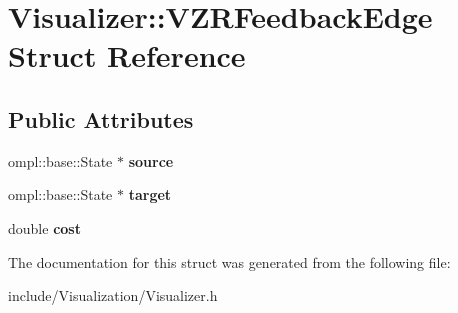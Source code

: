\hypertarget{struct_visualizer_1_1_v_z_r_feedback_edge}{\section{Visualizer\-:\-:V\-Z\-R\-Feedback\-Edge Struct Reference}
\label{struct_visualizer_1_1_v_z_r_feedback_edge}
}
\subsection*{Public Attributes}
\begin{DoxyCompactItemize}
\item 
\hypertarget{struct_visualizer_1_1_v_z_r_feedback_edge_a695aaf7f05e15712c5099290e8f52178}{ompl\-::base\-::\-State $\ast$ {\bfseries source}}\label{struct_visualizer_1_1_v_z_r_feedback_edge_a695aaf7f05e15712c5099290e8f52178}

\item 
\hypertarget{struct_visualizer_1_1_v_z_r_feedback_edge_a7fe277da37e4a0b174a028b2c0f5c267}{ompl\-::base\-::\-State $\ast$ {\bfseries target}}\label{struct_visualizer_1_1_v_z_r_feedback_edge_a7fe277da37e4a0b174a028b2c0f5c267}

\item 
\hypertarget{struct_visualizer_1_1_v_z_r_feedback_edge_a64c4c17999e2f783ab6b2cbce0e94277}{double {\bfseries cost}}\label{struct_visualizer_1_1_v_z_r_feedback_edge_a64c4c17999e2f783ab6b2cbce0e94277}

\end{DoxyCompactItemize}


The documentation for this struct was generated from the following file\-:\begin{DoxyCompactItemize}
\item 
include/\-Visualization/Visualizer.\-h\end{DoxyCompactItemize}
